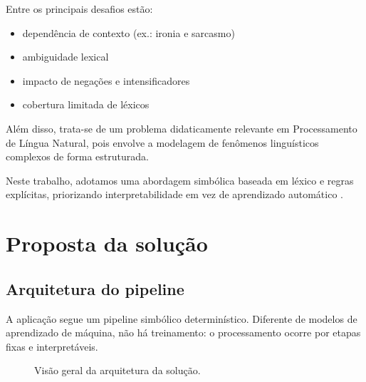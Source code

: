 \documentclass[11pt,a4paper]{article}
\begin{document}
Entre os principais desafios estão:
\begin{itemize}
  \item dependência de contexto (ex.: ironia e sarcasmo)
  \item ambiguidade lexical
  \item impacto de negações e intensificadores
  \item cobertura limitada de léxicos
\end{itemize}

Além disso, trata-se de um problema didaticamente relevante em Processamento de Língua Natural, pois envolve a modelagem de fenômenos linguísticos complexos de forma estruturada.

Neste trabalho, adotamos uma abordagem simbólica baseada em léxico e regras explícitas, priorizando interpretabilidade em vez de aprendizado automático \citep{taboada2011lexicon,hutto2014vader,souza2012sentiment}.

\section{Proposta da solução}

\subsection{Arquitetura do pipeline}

A aplicação segue um pipeline simbólico determinístico. Diferente de modelos de aprendizado de máquina, não há treinamento: o processamento ocorre por etapas fixas e interpretáveis.

\begin{figure}[h]
\centering
{}
\caption{Visão geral da arquitetura da solução.}
\end{figure}
\end{document}
